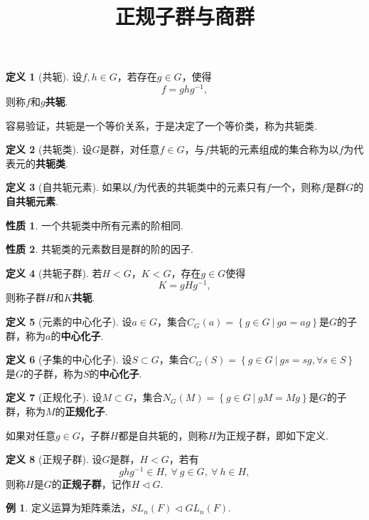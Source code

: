 \documentclass[12pt]{ctexart}
\title{\vspace{-2em}\textbf{正规子群与商群}\vspace{-2em}}
\date{ }
\theoremstyle{definition}
\newtheorem{definition}{定义}
\newtheorem{property}{性质}
\newtheorem{example}{例}
\theoremstyle{plain}
\begin{document}
	\maketitle
	\begin{definition}[共轭]
		设$f,h\in G$，若存在$g\in G$，使得
		$$f=ghg^{-1},$$
		则称$f$和$g$\textbf{共轭}.
	\end{definition}
	容易验证，共轭是一个等价关系，于是决定了一个等价类，称为共轭类.
	\begin{definition}[共轭类]
		设$G$是群，对任意$f\in G$，与$f$共轭的元素组成的集合称为以$f$为代表元的\textbf{共轭类}.
	\end{definition}
	\begin{definition}[自共轭元素]
		如果以$f$为代表的共轭类中的元素只有$f$一个，则称$f$是群$G$的\textbf{自共轭元素}.
	\end{definition}
	\begin{property}
		一个共轭类中所有元素的阶相同.
	\end{property}
	\begin{property}
		共轭类的元素数目是群的阶的因子.
	\end{property}
	\begin{definition}[共轭子群]
		若$H<G$，$K<G$，存在$g\in G$使得
		$$K=gHg^{-1},$$
		则称子群$H$和$K$\textbf{共轭}.
	\end{definition}
	\begin{definition}[元素的中心化子]
		设$a\in G$，集合$C_G(a)=\left\{g\in G\ |\ ga=ag\right\}$是$G$的子群，称为$a$的\textbf{中心化子}.
	\end{definition}
	\begin{definition}[子集的中心化子]
		设$S\subset G$，集合$C_G(S)=\left\{
		g\in G\ |\ gs=sg,\forall s\in S\right\}$是$G$的子群，称为$S$的\textbf{中心化子}.
	\end{definition}
	\begin{definition}[正规化子]
		设$M\subset G$，集合$N_G(M)=\left\{g\in G\ |\ gM=Mg\right\}$是$G$的子群，称为$M$的\textbf{正规化子}.
	\end{definition}
	如果对任意$g\in G$，子群$H$都是自共轭的，则称$H$为正规子群，即如下定义.
	\begin{definition}[正规子群]
		设$G$是群，$H<G$，若有
		$$ghg^{-1}\in H,\ \forall\ g\in G,\ \forall\ h\in H,$$
		则称$H$是$G$的\textbf{正规子群}，记作$H\vartriangleleft G$.
	\end{definition}
	\begin{example}
		定义运算为矩阵乘法，$SL_n(F)\vartriangleleft GL_n(F)$.
	\end{example}
\end{document}
